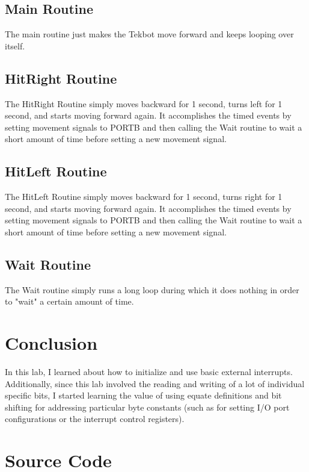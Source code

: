 \documentclass[12pt,letterpaper]{article}
\begin{document}
\subsection{Main Routine}

The main routine just makes the Tekbot move forward and keeps looping over
itself.

\subsection{HitRight Routine}

The HitRight Routine simply moves backward for 1 second, turns left for 1
second, and starts moving forward again.  It accomplishes the timed events by
setting movement signals to PORTB and then calling the Wait routine to wait a
short amount of time before setting a new movement signal.

\subsection{HitLeft Routine}

The HitLeft Routine simply moves backward for 1 second, turns right for 1
second, and starts moving forward again.  It accomplishes the timed events by
setting movement signals to PORTB and then calling the Wait routine to wait a
short amount of time before setting a new movement signal.

\subsection{Wait Routine}

The Wait routine simply runs a long loop during which it does nothing in order
to "wait" a certain amount of time.

\section{Conclusion}

In this lab, I learned about how to initialize and use basic external
interrupts.  Additionally, since this lab involved the reading and writing of a
lot of individual specific bits, I started learning the value of using equate
definitions and bit shifting for addressing particular byte constants (such as
for setting I/O port configurations or the interrupt control registers).

\section{Source Code}
\end{document}
